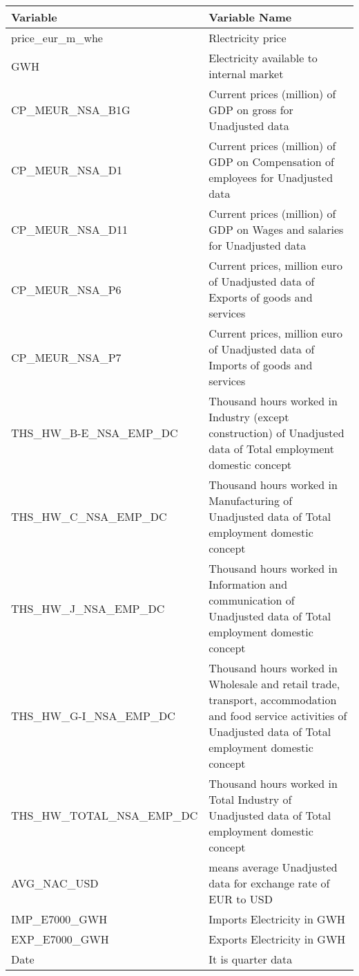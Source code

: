 \begin{tabular}{ |p{6cm} | p{10cm}| }

  \hline
   Variable &Variable Name\\
   \hline
    price\_eur\_m\_whe&Rlectricity price\\
       \hline
GWH&Electricity available to internal market\\
   \hline
CP\_MEUR\_NSA\_B1G&Current prices (million) of GDP on gross for Unadjusted data\\
   \hline
CP\_MEUR\_NSA\_D1&Current prices (million) of GDP on Compensation of employees for Unadjusted data\\
   \hline
CP\_MEUR\_NSA\_D11&Current prices (million) of GDP on Wages and salaries for Unadjusted data\\
   \hline
  CP\_MEUR\_NSA\_P6&Current prices, million euro of Unadjusted data of Exports of goods and services\\
     \hline
CP\_MEUR\_NSA\_P7&Current prices, million euro of Unadjusted data of Imports of goods and services\\
   \hline
THS\_HW\_B-E\_NSA\_EMP\_DC&Thousand hours worked in Industry (except construction) of Unadjusted data of Total employment domestic concept\\
   \hline
THS\_HW\_C\_NSA\_EMP\_DC&Thousand hours worked in Manufacturing of Unadjusted data of Total employment domestic concept\\
   \hline
THS\_HW\_J\_NSA\_EMP\_DC&Thousand hours worked in Information and communication of Unadjusted data of Total employment domestic concept\\
   \hline
THS\_HW\_G-I\_NSA\_EMP\_DC&Thousand hours worked in Wholesale and retail trade, transport, accommodation and food service activities of Unadjusted data of Total employment domestic concept\\
   \hline
THS\_HW\_TOTAL\_NSA\_EMP\_DC&Thousand hours worked in Total Industry of Unadjusted data of Total employment domestic concept\\
   \hline
AVG\_NAC\_USD&means average Unadjusted data for exchange rate of EUR to USD\\
   \hline
IMP\_E7000\_GWH&Imports Electricity in GWH\\
   \hline
EXP\_E7000\_GWH&Exports Electricity in GWH\\
   \hline
Date&It is quarter data\\
   \hline
\end{tabular}


